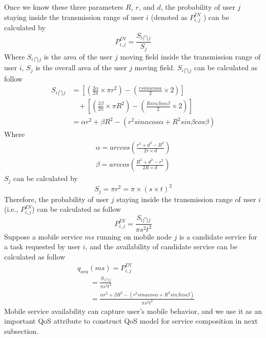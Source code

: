 \documentclass[10pt,journal,compsoc]{IEEEtran}
\begin{document}
​Once we know these three parameters $R$, $r$, and $d$, the probability of user $j$ staying inside the transmission range of user $i$ (denoted as $P_{i,j}^{IN}$ ) can be calculated by
\begin{equation}
P_{i,j}^{IN} = \frac{S_{i \bigcap j}}{S_j}
\end{equation}
Where $S_{i \bigcap j}$ is the area of the user $j$ moving field inside the transmission range of user $i$, $S_j$ is the overall area of the user $j$ moving field. $S_{i \bigcap j}$ can be calculated as follow
\setlength{\arraycolsep}{0.0em}
\begin{align}
S_{i \bigcap j} & =  [(\frac{2\alpha}{2\pi} \times \pi r^2)-(\frac{r sin\alpha cos\alpha}{2} \times 2)]\\\nonumber
& \ \ \ \ +[(\frac{2\beta}{2\pi} \times \pi R^2)-(\frac{R sin\beta cos\beta}{2} \times 2)]\\\nonumber
& = \alpha r^2 + \beta R^2 - (r^2 sin\alpha cos\alpha + R^2 sin\beta cos\beta)
\end{align}
\setlength{\arraycolsep}{5pt}
Where
\begin{eqnarray}
\alpha = arccos(\frac{r^2+d^2-R^2}{2r\times d}) \\\nonumber
\beta = arccos(\frac{R^2+d^2-r^2}{2R\times d})
\end{eqnarray}
$S_j$ can be calculated by
\begin{equation}
S_j = \pi r^2 = \pi \times (s \times t)^2
\end{equation}
Therefore, the probability of user $j$ staying inside the transmission range of user $i$ (i.e., $P_{i,j}^{IN}$) can be calculated as follow
\begin{equation}
P_{i,j}^{IN} = \frac{S_{i \bigcap j}}{\pi s^2 t^2}
\end{equation}
Suppose a mobile service $ms$ running on mobile node $j$ is a candidate service for a task requested by user $i$, and the availability of candidate service can be calculated as follow
\begin{align}
& \text{$q_{ava}(ms) = P_{i,j}^{IN}$} \\\nonumber
& \ \ \ \ \ \ \ \ = \frac{S_{i \bigcap j}}{\pi s^2 t^2}\\\nonumber
& \ \ \ \ \ \ \ \ = \frac{\alpha r^2 + \beta R^2 - (r^2 sin\alpha cos\alpha + R^2 sin\beta cos\beta)}{\pi s^2 t^2}
\end{align}
Mobile service availability can capture user's mobile behavior, and we use it as an important QoS attribute to construct QoS model for service composition in next subsection.
\end{document}
